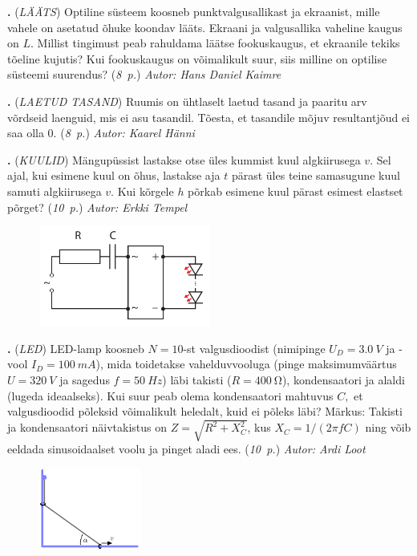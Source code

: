 \documentclass[11pt,a5paper]{article}
\newcommand{\numb}[1]{\vspace{5pt}\textbf{\large #1}}
\newcommand{\nimi}[1]{(\textsl{\small #1})}
\newcommand{\punktid}[1]{(\emph{#1~p.})}
\newcommand{\autor}[1]{\emph{ Autor: #1}}
\newcounter{ylesanne}
\newcommand{\yl}[1]{\addtocounter{ylesanne}{1}\numb{\theylesanne.} \nimi{#1} \newblock{}}
\begin{document}
\yl{LÄÄTS}
Optiline süsteem koosneb punktvalgusallikast ja ekraanist, mille vahele on asetatud õhuke koondav lääts. Ekraani ja valgusallika vaheline kaugus on $L$. Millist tingimust peab rahuldama läätse fookuskaugus, et ekraanile tekiks tõeline kujutis? Kui fookuskaugus on võimalikult suur, siis milline on optilise süsteemi suurendus?
\punktid{8} \autor{Hans Daniel Kaimre}

\yl{LAETUD TASAND}
Ruumis on ühtlaselt laetud tasand ja paaritu arv võrdseid laenguid, mis ei asu tasandil. Tõesta, et tasandile mõjuv resultantjõud ei saa olla 0.
\punktid{8} \autor{Kaarel Hänni}

\yl{KUULID}
Mängupüssist lastakse otse üles kummist kuul algkiirusega $v$. Sel ajal, kui esimene kuul on õhus, lastakse aja $t$ pärast üles teine samasugune kuul samuti algkiirusega $v$. Kui kõrgele $h$ põrkab esimene kuul pärast esimest elastset põrget?
\punktid{10} \autor{Erkki Tempel}

\begin{figure}
	\vspace{-24pt}
	\includegraphics[width=0.5\textwidth]{LED_joonis.pdf}
\end{figure}

\yl{LED}
LED-lamp koosneb $N=10$-st valgusdioodist (nimipinge $U_{D}=\SI{3.0}{V}$ ja -vool $I_{D}=\SI{100}{mA}$), mida toidetakse vahelduvvooluga (pinge maksimumväärtus $U=\SI{320}{V}$ ja sagedus $f=\SI{50}{Hz}$) läbi takisti ($R=\SI{400}{\ohm}$), kondensaatori ja alaldi (lugeda ideaalseks). Kui suur peab olema kondensaatori mahtuvus $C,$ et valgusdioodid põleksid võimalikult heledalt, kuid ei põleks läbi? Märkus: Takisti ja kondensaatori näivtakistus on $Z=\sqrt{R^{2}+X_{C}^{2}}$, kus $X_{C}=1/\left(2\pi fC\right)$ ning võib eeldada sinusoidaalset voolu ja pinget aladi ees. 
\punktid{10} \autor{Ardi Loot}

\begin{figure}
	\vspace{-13pt}
	\includegraphics[width=0.3\textwidth]{niit_relsil.pdf}
\end{figure}
\end{document}
